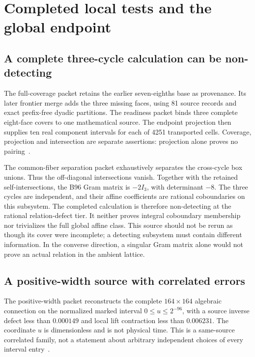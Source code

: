 \documentclass[11pt]{article}
\theoremstyle{definition}
\theoremstyle{remark}
\begin{document}
\section{Completed local tests and the global endpoint}
\label{sec:local-global-import}

\subsection{A complete three-cycle calculation can be non-detecting}
\label{sec:cycles-import}

The full-coverage packet retains the earlier seven-eighths base as
provenance. Its later frontier merge adds the three missing faces, using
81 source records and exact prefix-free dyadic partitions. The readiness
packet binds three complete eight-face covers to one mathematical source.
The endpoint projection then supplies ten real component intervals for
each of 4251 transported cells. Coverage, projection and intersection
are separate assertions: projection alone proves no pairing~\cite{FluxCycles}.

The common-fiber separation packet exhaustively separates the cross-cycle
box unions. Thus the off-diagonal intersections vanish. Together with
the retained self-intersections, the B96 Gram matrix is \(-2I_3\), with
determinant \(-8\). The three cycles are independent, and their affine
coefficients are rational coboundaries on this subsystem. The completed
calculation is therefore non-detecting at the rational relation-defect
tier. It neither proves integral coboundary membership nor trivializes
the full global affine class. This source should not be rerun as though
its cover were incomplete; a detecting subsystem must contain different
information. In the converse direction, a singular Gram matrix alone
would not prove an actual relation in the ambient lattice.

\subsection{A positive-width source with correlated errors}
\label{sec:tube-import}

The positive-width packet reconstructs the complete \(164\times164\)
algebraic connection on the normalized marked interval
\(0\leq u\leq2^{-96}\), with a source inverse defect less than
\(0.000149\) and local lift contraction less than \(0.006231\).
The coordinate \(u\) is dimensionless and is not physical time.
This is a same-source correlated family, not a statement about arbitrary
independent choices of every interval entry~\cite{FluxTube}.
\end{document}

